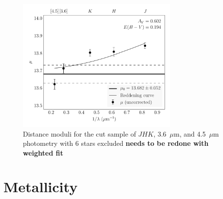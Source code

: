 \documentclass[a4paper,fleqn,usenatbib]{mnras}
\begin{document}
\begin{figure}
\begin{center}
\includegraphics[width=80mm]{final_plots/multiwavelength_distance_samestars_4p5trimmed.pdf}
\caption{Distance moduli for the cut sample of $J\!H\!K$, 3.6~$\mu$m, and 4.5~$\mu$m photometry with 6 stars excluded {\bf needs to be redone with weighted fit} %
}
\label{fig:omegaCen_dist_m4_trimmed}
\end{center}
\end{figure}


\section{Metallicity}
\label{sec:metallicity}


\end{document}
